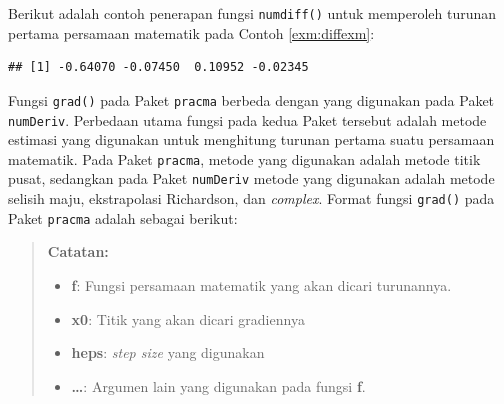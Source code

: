 \documentclass[]{book}
\newenvironment{Shaded}{\begin{snugshade}}{\end{snugshade}}
\newcommand{\ControlFlowTok}[1]{\textcolor[rgb]{0.13,0.29,0.53}{\textbf{#1}}}
\newcommand{\DataTypeTok}[1]{\textcolor[rgb]{0.13,0.29,0.53}{#1}}
\newcommand{\DecValTok}[1]{\textcolor[rgb]{0.00,0.00,0.81}{#1}}
\newcommand{\KeywordTok}[1]{\textcolor[rgb]{0.13,0.29,0.53}{\textbf{#1}}}
\newcommand{\NormalTok}[1]{#1}
\newcommand{\OperatorTok}[1]{\textcolor[rgb]{0.81,0.36,0.00}{\textbf{#1}}}
\providecommand{\tightlist}{%
  \setlength{\itemsep}{0pt}\setlength{\parskip}{0pt}}
\theoremstyle{definition}
\theoremstyle{definition}
\theoremstyle{definition}
\theoremstyle{remark}
\begin{document}
Berikut adalah contoh penerapan fungsi \texttt{numdiff()} untuk memperoleh turunan pertama persamaan matematik pada Contoh \ref{exm:diffexm}:

\begin{Shaded}
\end{Shaded}

\begin{verbatim}
## [1] -0.64070 -0.07450  0.10952 -0.02345
\end{verbatim}

Fungsi \texttt{grad()} pada Paket \texttt{pracma} berbeda dengan yang digunakan pada Paket \texttt{numDeriv}. Perbedaan utama fungsi pada kedua Paket tersebut adalah metode estimasi yang digunakan untuk menghitung turunan pertama suatu persamaan matematik. Pada Paket \texttt{pracma}, metode yang digunakan adalah metode titik pusat, sedangkan pada Paket \texttt{numDeriv} metode yang digunakan adalah metode selisih maju, ekstrapolasi Richardson, dan \emph{complex}. Format fungsi \texttt{grad()} pada Paket \texttt{pracma} adalah sebagai berikut:

\begin{Shaded}
\end{Shaded}

\begin{quote}
\textbf{Catatan:}

\begin{itemize}
\tightlist
\item
  \textbf{f}: Fungsi persamaan matematik yang akan dicari turunannya.
\item
  \textbf{x0}: Titik yang akan dicari gradiennya
\item
  \textbf{heps}: \emph{step size} yang digunakan
\item
  \textbf{\ldots{}}: Argumen lain yang digunakan pada fungsi \textbf{f}.
\end{itemize}
\end{quote}
\end{document}
